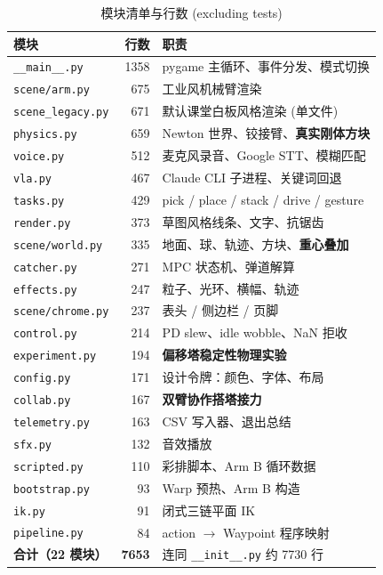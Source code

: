 \documentclass[12pt, a4paper, UTF8]{ctexart}
\begin{document}
\begin{table}[h]
\centering
\small
\caption{模块清单与行数 (excluding tests)}
\label{tab:modules}
\begin{tabular}{lrl}
\toprule
模块 & 行数 & 职责 \\
\midrule
\texttt{\_\_main\_\_.py}    & 1358 & pygame 主循环、事件分发、模式切换 \\
\texttt{scene/arm.py}       &  675 & 工业风机械臂渲染 \\
\texttt{scene\_legacy.py}   &  671 & 默认课堂白板风格渲染 (单文件) \\
\texttt{physics.py}         &  659 & Newton 世界、铰接臂、\textbf{真实刚体方块} \\
\texttt{voice.py}           &  512 & 麦克风录音、Google STT、模糊匹配 \\
\texttt{vla.py}             &  467 & Claude CLI 子进程、关键词回退 \\
\texttt{tasks.py}           &  429 & pick / place / stack / drive / gesture \\
\texttt{render.py}          &  373 & 草图风格线条、文字、抗锯齿 \\
\texttt{scene/world.py}     &  335 & 地面、球、轨迹、方块、\textbf{重心叠加} \\
\texttt{catcher.py}         &  271 & MPC 状态机、弹道解算 \\
\texttt{effects.py}         &  247 & 粒子、光环、横幅、轨迹 \\
\texttt{scene/chrome.py}    &  237 & 表头 / 侧边栏 / 页脚 \\
\texttt{control.py}         &  214 & PD slew、idle wobble、NaN 拒收 \\
\texttt{experiment.py}      &  194 & \textbf{偏移塔稳定性物理实验} \\
\texttt{config.py}          &  171 & 设计令牌：颜色、字体、布局 \\
\texttt{collab.py}          &  167 & \textbf{双臂协作搭塔接力} \\
\texttt{telemetry.py}       &  163 & CSV 写入器、退出总结 \\
\texttt{sfx.py}             &  132 & 音效播放 \\
\texttt{scripted.py}        &  110 & 彩排脚本、Arm B 循环数据 \\
\texttt{bootstrap.py}       &   93 & Warp 预热、Arm B 构造 \\
\texttt{ik.py}              &   91 & 闭式三链平面 IK \\
\texttt{pipeline.py}        &   84 & action $\to$ Waypoint 程序映射 \\
\midrule
\textbf{合计（22 模块）}     & \textbf{7653} & \footnotesize 连同 \texttt{\_\_init\_\_.py} 约 7730 行 \\
\bottomrule
\end{tabular}
\end{table}
\end{document}
